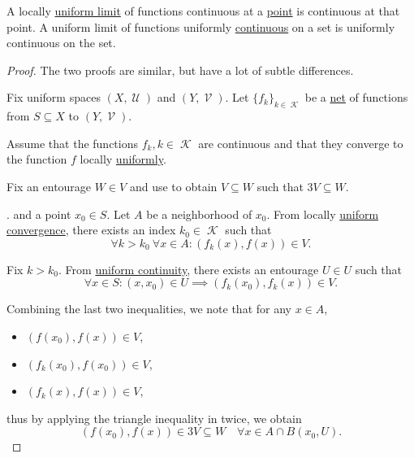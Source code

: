 \begin{proposition}\label{thm:uniform_limit_of_continuous_functions}
  \hfill
  \begin{thmenum}
     A locally \hyperref[def:function_net_convergence]{uniform limit} of functions continuous at a \hyperref[thm:uniform_space_local_continuity]{point} is continuous at that point.
     A uniform limit of functions uniformly \hyperref[def:uniform_continuity]{continuous} on a set is uniformly continuous on the set.
  \end{thmenum}
\end{proposition}
\begin{proof}
  The two proofs are similar, but have a lot of subtle differences.

  Fix uniform spaces \( (X, \mscrU) \) and \( (Y, \mscrV) \). Let \( \{ f_k \}_{k \in \mscrK} \) be a \hyperref[def:topological_net]{net} of functions from \( S \subseteq X \) to \( (Y, \mscrV) \).

   Assume that the functions \( f_k, k \in \mscrK \) are continuous and that they converge to the function \( f \) locally \hyperref[def:function_net_convergence/locally_uniform]{uniformly}.

  Fix an entourage \( W \in V \) and use  to obtain \( V \subseteq W \) such that \( 3V \subseteq W \).

  . and a point \( x_0 \in S \). Let \( A \) be a neighborhood of \( x_0 \). From locally \hyperref[def:function_net_convergence]{uniform convergence}, there exists an index \( k_0 \in \mscrK \) such that
  \begin{equation*}
    \forall k > k_0 \ \forall x \in A : (f_k(x), f(x)) \in V.
  \end{equation*}

  Fix \( k > k_0 \). From \hyperref[def:function_net_convergence/locally_uniform]{uniform continuity}, there exists an entourage \( U \in U \) such that
  \begin{equation*}
    \forall x \in S : (x, x_0) \in U \implies (f_k(x_0), f_k(x)) \in V.
  \end{equation*}

  Combining the last two inequalities, we note that for any \( x \in A \),
  \begin{itemize}
    \item \( (f(x_0), f(x)) \in V \),
    \item \( (f_k(x_0), f(x_0)) \in V \),
    \item \( (f_k(x), f(x)) \in V \),
  \end{itemize}
  thus by applying the triangle inequality in  twice, we obtain
  \begin{equation*}
    (f(x_0), f(x)) \in 3V \subseteq W \quad\forall x \in A \cap B(x_0, U).
  \end{equation*}


\end{proof}

